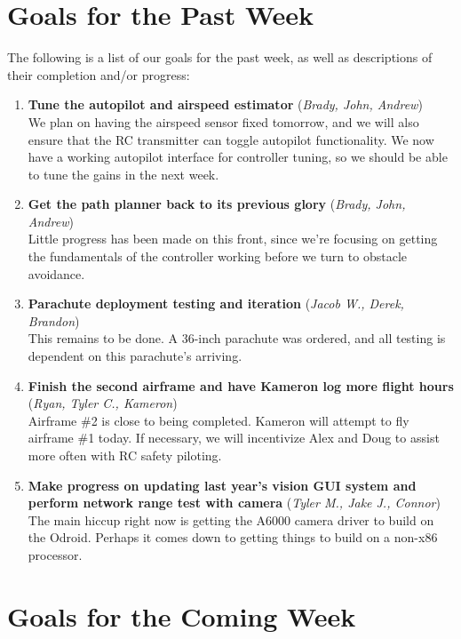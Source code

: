 \documentclass[]{../auvsi_doc}
\begin{document}
\section{Goals for the Past Week}

The following is a list of our goals for the past week, as well as descriptions of their completion and/or progress:

\begin{enumerate}
	\item \textbf{Tune the autopilot and airspeed estimator} (\textit{Brady, John, Andrew}) \\
	We plan on having the airspeed sensor fixed tomorrow, and we will also ensure that the RC transmitter can toggle autopilot functionality. We now have a working autopilot interface for controller tuning, so we should be able to tune the gains in the next week.
	\item \textbf{Get the path planner back to its previous glory} (\textit{Brady, John, Andrew}) \\
	Little progress has been made on this front, since we're focusing on getting the fundamentals of the controller working before we turn to obstacle avoidance.
	\item \textbf{Parachute deployment testing and iteration} (\textit{Jacob W., Derek, Brandon}) \\
	This remains to be done. A 36-inch parachute was ordered, and all testing is dependent on this parachute's arriving.
	\item \textbf{Finish the second airframe and have Kameron log more flight hours} (\textit{Ryan, Tyler C., Kameron}) \\
	Airframe \#2 is close to being completed. Kameron will attempt to fly airframe \#1 today. If necessary, we will incentivize Alex and Doug to assist more often with RC safety piloting.
	\item \textbf{Make progress on updating last year's vision GUI system and perform network range test with camera} (\textit{Tyler M., Jake J., Connor}) \\
	The main hiccup right now is getting the A6000 camera driver to build on the Odroid. Perhaps it comes down to getting things to build on a non-x86 processor.
\end{enumerate}

\section{Goals for the Coming Week}
\end{document}
